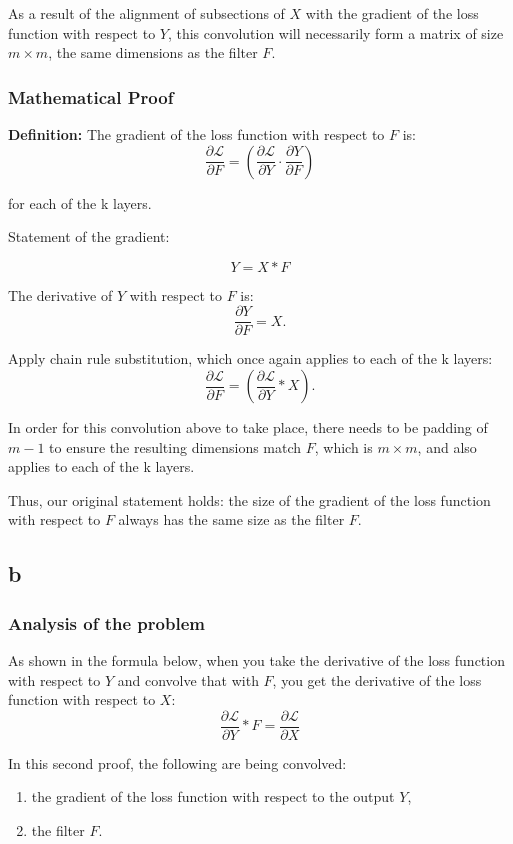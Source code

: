 \documentclass{article}
\begin{document}
As a result of the alignment of subsections of \( X \) with the gradient of the loss function with respect to \( Y \), this convolution will necessarily form a matrix of size \( m \times m \), the same dimensions as the filter \( F \).

\subsubsection{Mathematical Proof}

\textbf{Definition:} The gradient of the loss function with respect to \( F \) is:
\[
\frac{\partial \mathcal{L}}{\partial F} = \left( \frac{\partial \mathcal{L}}{\partial Y} \cdot \frac{\partial Y}{\partial F} \right)
\]

for each of the k layers.

Statement of the gradient:

\[
Y = X \ast F
\]

The derivative of \( Y \) with respect to \( F \) is:
\[
\frac{\partial Y}{\partial F} = X.
\]

Apply chain rule substitution, which once again applies to each of the k layers:
\[
\frac{\partial \mathcal{L}}{\partial F} = \left( \frac{\partial \mathcal{L}}{\partial Y} \ast X \right).
\]

In order for this convolution above to take place, there needs to be padding of \( m - 1 \) to ensure the resulting dimensions match \( F \), which is \( m \times m\), and also applies to each of the k layers.

Thus, our original statement holds: the size of the gradient of the loss function with respect to \( F \) always has the same size as the filter \( F \).

\subsection{b}

\subsubsection{Analysis of the problem}

As shown in the formula below, when you take the derivative of the loss function with respect to \( Y \) and convolve that with \( F \), you get the derivative of the loss function with respect to \( X \):
\[
\frac{\partial \mathcal{L}}{\partial Y} \ast F = \frac{\partial \mathcal{L}}{\partial X}
\]

In this second proof, the following are being convolved: 
\begin{enumerate}
    \item the gradient of the loss function with respect to the output \( Y \), 
    \item the filter \( F \).
\end{enumerate}
\end{document}
